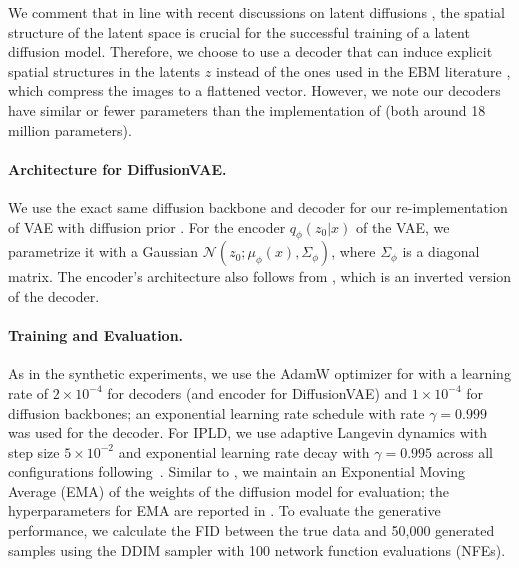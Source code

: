 We comment that in line with recent discussions on latent diffusions \citep{dieleman2025latents}, the spatial structure of the latent space is crucial for the successful training of a latent diffusion model. Therefore, we choose to use a decoder that can induce explicit spatial structures in the latents $z$ instead of the ones used in the \gls*{EBM} literature \citep{yu2023learning}, which compress the images to a flattened vector. However, we note our decoders have similar or fewer parameters than the implementation of \citet{yu2023learning} (both around 18 million parameters).

\paragraph{Architecture for \gls*{DiffusionVAE}.} We use the exact same diffusion backbone and decoder for our re-implementation of \gls*{VAE} with diffusion prior \citep{wehenkeldiffusionpriorsvariational2021}. For the encoder $q_\phi(z_0| x)$ of the \gls*{VAE}, we parametrize it with a Gaussian $\mathcal{N}(z_0;\mu_\phi( x), \Sigma_\phi)$, where $\Sigma_\phi$ is a diagonal matrix. The encoder's architecture also follows from \citet{rombachhighresolutionimagesynthesis2022},  which is an inverted version of the decoder.
\paragraph{Training and Evaluation.} As in the synthetic experiments, we use the AdamW optimizer 
\citep{loshchilov2019decoupledweightdecayregularization} for with a learning rate of $2\times10^{-4}$ for decoders (and encoder for \gls*{DiffusionVAE}) and $1\times 10^{-4}$ for diffusion backbones; an exponential learning rate schedule with rate $\gamma = 0.999$ was used for the decoder. For \gls*{IPLD}, we use adaptive Langevin dynamics \citep{kim2020stochasticgradientlangevindynamics} with step size $5\times 10^{-2}$ and exponential learning rate decay with $\gamma=0.995$ across all configurations following~\citet{kuntz23a}. Similar to \citet{song2020improved}, we maintain an Exponential Moving Average (EMA) of the weights of the diffusion model for evaluation; the hyperparameters for EMA are reported in . To evaluate the generative performance, we calculate the \gls*{FID} \citep{heusel2017gan} between the true data and 50,000 generated samples using the DDIM sampler \citep{song2022denoisingdiffusionimplicitmodels} with 100 network function evaluations (NFEs).

